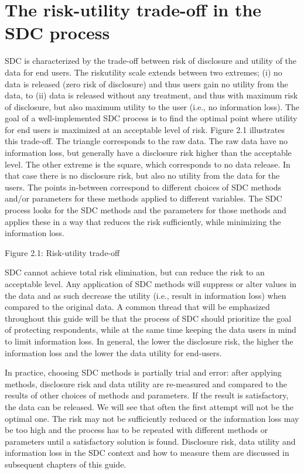 \documentclass[letterpaper,10pt,english]{sphinxmanual}
\begin{document}
\section{The risk-utility trade-off in the SDC process}
\label{\detokenize{SDC_intro:the-risk-utility-trade-off-in-the-sdc-process}}
SDC is characterized by the trade-off between risk of disclosure and
utility of the data for end users. The risk\textendash{}utility scale extends
between two extremes; (i) no data is released (zero risk of disclosure)
and thus users gain no utility from the data, to (ii) data is released
without any treatment, and thus with maximum risk of disclosure, but
also maximum utility to the user (i.e., no information loss). The goal
of a well-implemented SDC process is to find the optimal point where
utility for end users is maximized at an acceptable level of risk.
Figure 2.1 illustrates this trade-off. The triangle corresponds to the
raw data. The raw data have no information loss, but generally have a
disclosure risk higher than the acceptable level. The other extreme is
the square, which corresponds to no data release. In that case there is
no disclosure risk, but also no utility from the data for the users. The
points in-between correspond to different choices of SDC methods and/or
parameters for these methods applied to different variables. The SDC
process looks for the SDC methods and the parameters for those methods
and applies these in a way that reduces the risk sufficiently, while
minimizing the information loss.

\noindent{}

Figure 2.1: Risk-utility trade-off

SDC cannot achieve total risk elimination, but can reduce the risk to an
acceptable level. Any application of SDC methods will suppress or alter
values in the data and as such decrease the utility (i.e., result in
information loss) when compared to the original data. A common thread
that will be emphasized throughout this guide will be that the process
of SDC should prioritize the goal of protecting respondents, while at
the same time keeping the data users in mind to limit information loss.
In general, the lower the disclosure risk, the higher the information
loss and the lower the data utility for end-users.

In practice, choosing SDC methods is partially trial and error: after
applying methods, disclosure risk and data utility are re-measured and
compared to the results of other choices of methods and parameters. If
the result is satisfactory, the data can be released. We will see that
often the first attempt will not be the optimal one. The risk may not be
sufficiently reduced or the information loss may be too high and the
process has to be repeated with different methods or parameters until a
satisfactory solution is found. Disclosure risk, data utility and
information loss in the SDC context and how to measure them are
discussed in subsequent chapters of this guide.
\end{document}
